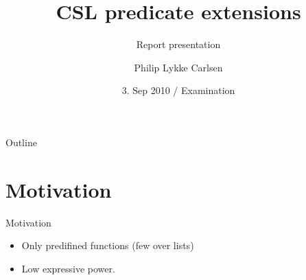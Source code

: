 \documentclass{beamer}
\title %
{CSL predicate extensions}
\subtitle
{Report presentation} %
\author %
{Philip Lykke Carlsen}
\date[Exam] %
{ 3. Sep 2010 / Examination}
\begin{document}
\begin{frame}
  \titlepage
\end{frame}

\begin{frame}{Outline}
  \tableofcontents
\end{frame}




\section{Motivation}


\begin{frame}{Motivation}

  \begin{itemize}
  \item
    Only predifined functions (few over lists)
  \item
    Low expressive power.
  \end{itemize}
\end{frame}
\end{document}
